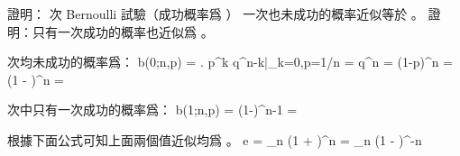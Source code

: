 \stopANSWER

\startEXERCISE\DIFFICULT
證明：  次 Bernoulli 試驗（成功概率爲 ）
一次也未成功的概率近似等於 。
證明：只有一次成功的概率也近似爲 。
\stopEXERCISE

\startANSWER
{} 次均未成功的概率爲：
\startformula
b(0;n,p)
  = \left. p^k q^{n-k}\right|_{k=0,p=1/n}
  =  q^n
  = (1-p)^n
  = \left(1 - \right)^n
  = 
\stopformula

 次中只有一次成功的概率爲：
\startformula
b(1;n,p)
  =   \left(1-\right)^{n-1}
  = 
\stopformula

根據下面公式可知上面兩個值近似均爲 。
\startformula
e = \lim_{n \to \infty}\left(1 + \right)^n
     = \lim_{n \to \infty}\left(1 - \right)^{-n}
\stopformula
\stopANSWER

\stopsection
